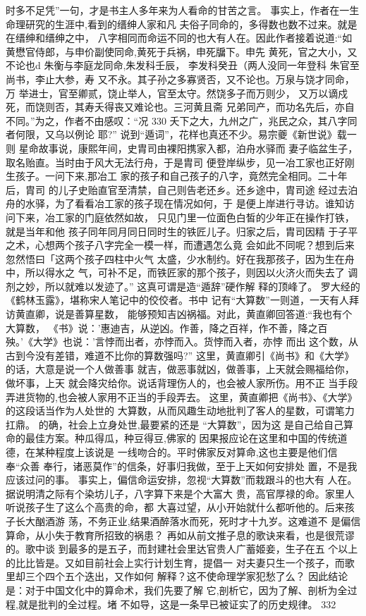 时多不足凭”一句，才是书主人多年来为人看命的甘苦之言。
事实上，作者在一生命理研究的生涯中,看到的缙绅人家和凡
夫俗子同命的，多得数也数不过来。就是在缙绅和缙绅之中，
八字相同而命运不同的也大有人在。因此作者接着说道:“如
黄懋官侍郎，与申价副使同命,黄死于兵祸，申死牖下。申先
黄死，官之大小，又不论也d 朱衡与李庭龙同命,朱发科壬辰，
李发科癸丑（两人没同一年登科 朱官至尚书，李止大参，寿
又不永。其子孙之多寡贤否，又不论也。万泉与饶才同命，万
举进士，官至卿贰，饶止举人，官至太守。然饶多子而万则少，
又万以谪戍死，而饶则否，其寿夭得丧又难论也。三河黄且斋
兄弟同产，而功名先后，亦自不同。”为之，作者不由感叹：“况
330 
夭下之大，九州之广，兆民之众，其八字同者何限，又乌以例论
耶?”
说到“遁词”，花样也真还不少。易宗夔《新世说》载一则
星命故事说，康熙年间，史胄司由裸阳携家入都，泊舟水驿而
妻子临盆生子，取名贻直。当时由于风大无法行舟，于是胄司
便登岸纵步，见一冶工家也正好刚生孩子。一问下来,那冶工
家的孩子和自己孩子的八字，竟然完全相同。二十年后，胄司
的儿子史贻直官至清禁，自己则告老还乡。还乡途中，胄司途
经过去泊舟的水驿，为了看看冶工家的孩子现在情况如何，于
是便上岸进行寻访。谁知访问下来，冶工家的门庭依然如故，
只见门里一位面色白皙的少年正在操作打铁，就是当年和他
孩子同年同月同日同时生的铁匠儿子。归家之后，胄司因精
于子平之术，心想两个孩子八字完全一模一样，而遭遇怎么竟
会如此不同呢？想到后来忽然悟曰「这两个孩子四柱中火气
太盛，少水制约。好在我那孩子，因为生在舟中，所以得水之
气，可补不足，而铁匠家的那个孩子，则因以火济火而失去了
调剂之妙，所以就难以发迹了。” 这真可谓是造“遁辞”硬作解
释的顶峰了。
罗大经的《鹤林玉露》，堪称宋人笔记中的佼佼者。书中
记有“大算数”一则道，一天有人拜访黄直卿，说是善算星数，
能够预知吉凶祸福。对此，黄直卿回答道:“我也有个大算数，
《书》说：'惠迪吉，从逆凶。作善，降之百祥，作不善，降之百
殃。’《大学》也说：'言悖而出者，亦悖而入。货悖而入者，亦悖
而出 这个数，从古到今没有差错，难道不比你的算数强吗?”
这里，黄直卿引《尚书》和《大学》的话，大意是说一个人做善事
就吉，做恶事就凶，做善事，上天就会赐福给你，做坏事，上天
就会降灾给你。说话背理伤人的，也会被人家所伤。用不正
当手段弄进货物的,也会被人家用不正当的手段弄去。
这里，黄直卿把《尚书》、《大学》的这段话当作为人处世的
大算数，从而风趣生动地批判了客人的星数，可谓笔力扛鼎。
的确，社会上立身处世,最要紧的还是 “大算数”，因为这
是自己给自己算命的最佳方案。种瓜得瓜，种豆得豆,佛家的
因果报应论在这里和中国的传统道德，在某种程度上该说是
一线吻合的。平时佛家反对算命,这也主要是他们信奉“众善
奉行，诸恶莫作”的信条，好事归我做，至于上天如何安排处
置，不是我应该过问的事。
事实上，偏信命运安排，忽视“大算数”而栽跟斗的也大有
人在。据说明清之际有个染坊儿子，八字算下来是个大富大
贵，高官厚禄的命。家里人听说孩子生了这么个高贵的命，都
大喜过望，从小开始就什么都听他的。后来孩子长大酗酒游
荡，不务正业,结果酒醉落水而死，死时才十九岁。这难道不
是偏信算命，从小失于教育所招致的祸患？
再如从前文推子息的歌诀来看，也是很荒谬的。歌中谈
到最多的是五子，而封建社会里达官贵人广蓄姬妾，生子在五
个以上的比比皆是。又如目前社会上实行计划生育，提倡一
对夫妻只生一个孩子，而歌里却三个四个五个迭出，又作如何
解释？这不使命理学家犯愁了么？
因此结论是：对于中国文化中的算命术，我们先要了解
它,剖析它，因为了解、剖析为全过程,就是批判的全过程。堵
不如导，这是一条早已被证实了的历史规律。
 332 

